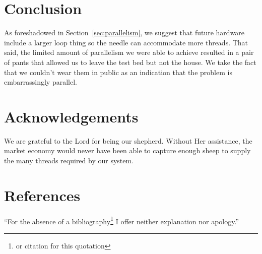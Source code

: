 \documentclass[letterpaper,twocolumn,12pt]{article}
\begin{document}
\section{Conclusion}
As foreshadowed in Section~\ref{sec:parallelism}, we suggest that future hardware include a larger loop thing so the needle can accommodate more threads.
That said, the limited amount of parallelism we were able to achieve resulted in a pair of pants that allowed us to leave the test bed but not the house.
We take the fact that we couldn't wear them in public as an indication that the problem is embarrassingly parallel.

\section*{Acknowledgements}
We are grateful to the Lord for being our shepherd.
Without Her assistance, the market economy would never have been able to capture enough sheep to supply the many threads required by our system.

\section*{References}
``For the absence of a bibliography\footnote{or citation for this quotation} I offer neither explanation nor apology.''
\end{document}
